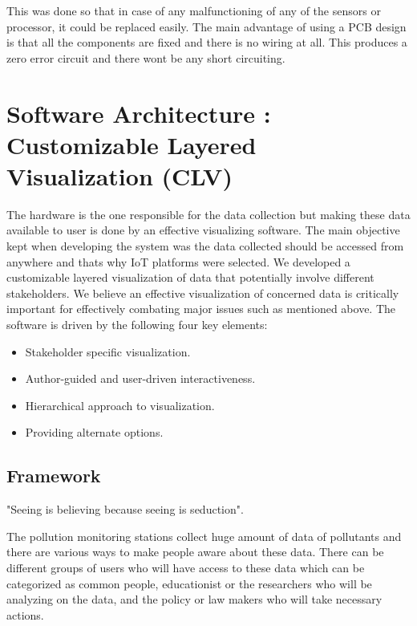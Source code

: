  This was done so that in case of any malfunctioning of any of the sensors or processor, it could be replaced easily. The main advantage of using a PCB design is that all the components are fixed and there is no wiring at all. This produces a zero error circuit and there wont be any short circuiting.

\section{Software Architecture : Customizable Layered Visualization (CLV)}

The hardware is the one responsible for the data collection but making these data available to user is done by an effective visualizing software. The main objective kept when developing the system was the data collected should be accessed from anywhere and thats why IoT platforms were selected. We developed a customizable layered visualization of data that potentially involve different stakeholders. We believe an effective visualization of concerned data is critically important for effectively combating major issues such as mentioned above. The software is driven by the following four key elements:

\begin{itemize}

\item Stakeholder specific  visualization.

\item Author-guided and user-driven interactiveness.

\item Hierarchical approach to visualization.

\item Providing alternate options.

\end{itemize}



\subsection{Framework}

"Seeing is believing because seeing is seduction"\cite{Hepworth}.

The pollution monitoring stations collect huge amount of data of pollutants and there are various ways to make people aware about these data. There can be different groups of users who will have access to these data which can be categorized as common people, educationist or the researchers who will be analyzing on the data, and the policy or law makers who will take necessary actions.

